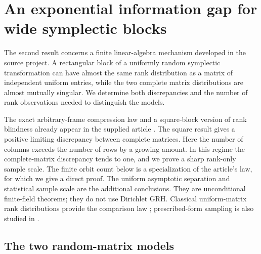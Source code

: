 \section{An exponential information gap for wide symplectic blocks}
\label{sec:symplectic-information}

The second result concerns a finite linear-algebra mechanism developed in the
source project.  A rectangular block of a uniformly random symplectic
transformation can have almost the same rank distribution as a matrix of
independent uniform entries, while the two complete matrix distributions are
almost mutually singular.  We determine both discrepancies and the number of
rank observations needed to distinguish the models.

The exact arbitrary-frame compression law and a square-block version of rank
blindness already appear in the supplied article
\cite[sections on symplectic compressions and Lagrangian projections]{ProveItArticle}.
The square result gives a positive limiting discrepancy between complete
matrices.  Here the number of columns exceeds the number of rows by a growing
amount.  In this regime the complete-matrix discrepancy tends to one, and we
prove a sharp rank-only sample scale.  The finite orbit count below is a
specialization of the article's law, for which we give a direct proof.  The
uniform asymptotic separation and statistical sample scale are the additional
conclusions.  They are unconditional finite-field theorems; they do not use
Dirichlet GRH.  Classical uniform-matrix rank distributions provide the
comparison law \cite{FulmanGoldstein2015}; prescribed-form sampling is also
studied in \cite{Ishizuka2026}.

\subsection{The two random-matrix models}

